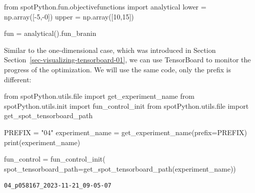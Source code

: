 \documentclass[
  letterpaper,
  DIV=11,
  numbers=noendperiod]{scrreprt}
\newenvironment{Shaded}{\begin{snugshade}}{\end{snugshade}}
\newcommand{\BuiltInTok}[1]{\textcolor[rgb]{0.00,0.23,0.31}{#1}}
\newcommand{\DecValTok}[1]{\textcolor[rgb]{0.68,0.00,0.00}{#1}}
\newcommand{\ImportTok}[1]{\textcolor[rgb]{0.00,0.46,0.62}{#1}}
\newcommand{\NormalTok}[1]{\textcolor[rgb]{0.00,0.23,0.31}{#1}}
\newcommand{\OperatorTok}[1]{\textcolor[rgb]{0.37,0.37,0.37}{#1}}
\newcommand{\StringTok}[1]{\textcolor[rgb]{0.13,0.47,0.30}{#1}}
\begin{document}
\begin{Shaded}
\begin{Highlighting}[]
\ImportTok{from}\NormalTok{ spotPython.fun.objectivefunctions }\ImportTok{import}\NormalTok{ analytical}
\NormalTok{lower }\OperatorTok{=}\NormalTok{ np.array([}\OperatorTok{{-}}\DecValTok{5}\NormalTok{,}\OperatorTok{{-}}\DecValTok{0}\NormalTok{])}
\NormalTok{upper }\OperatorTok{=}\NormalTok{ np.array([}\DecValTok{10}\NormalTok{,}\DecValTok{15}\NormalTok{])}
\end{Highlighting}
\end{Shaded}

\begin{Shaded}
\begin{Highlighting}[]
\NormalTok{fun }\OperatorTok{=}\NormalTok{ analytical().fun\_branin}
\end{Highlighting}
\end{Shaded}

\begin{tcolorbox}[enhanced jigsaw, rightrule=.15mm, opacityback=0, colframe=quarto-callout-note-color-frame, opacitybacktitle=0.6, toptitle=1mm, arc=.35mm, colbacktitle=quarto-callout-note-color!10!white, coltitle=black, toprule=.15mm, leftrule=.75mm, titlerule=0mm, title=\textcolor{quarto-callout-note-color}{\faInfo}\hspace{0.5em}{TensorBoard}, bottomrule=.15mm, breakable, bottomtitle=1mm, left=2mm, colback=white]

Similar to the one-dimensional case, which was introduced in Section
Section~\ref{sec-visualizing-tensorboard-01}, we can use TensorBoard to
monitor the progress of the optimization. We will use the same code,
only the prefix is different:

\begin{Shaded}
\begin{Highlighting}[]
\ImportTok{from}\NormalTok{ spotPython.utils.}\BuiltInTok{file} \ImportTok{import}\NormalTok{ get\_experiment\_name}
\ImportTok{from}\NormalTok{ spotPython.utils.init }\ImportTok{import}\NormalTok{ fun\_control\_init}
\ImportTok{from}\NormalTok{ spotPython.utils.}\BuiltInTok{file} \ImportTok{import}\NormalTok{ get\_spot\_tensorboard\_path}

\NormalTok{PREFIX }\OperatorTok{=} \StringTok{"04"}
\NormalTok{experiment\_name }\OperatorTok{=}\NormalTok{ get\_experiment\_name(prefix}\OperatorTok{=}\NormalTok{PREFIX)}
\BuiltInTok{print}\NormalTok{(experiment\_name)}

\NormalTok{fun\_control }\OperatorTok{=}\NormalTok{ fun\_control\_init(}
\NormalTok{    spot\_tensorboard\_path}\OperatorTok{=}\NormalTok{get\_spot\_tensorboard\_path(experiment\_name))}
\end{Highlighting}
\end{Shaded}

\begin{verbatim}
04_p058167_2023-11-21_09-05-07
\end{verbatim}

\end{tcolorbox}
\end{document}
